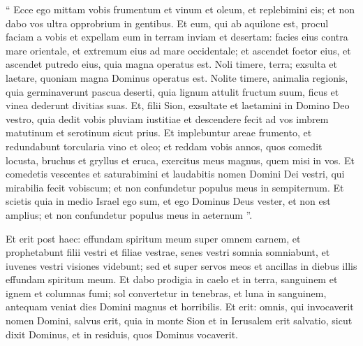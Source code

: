 \begin{biblechapter}
\begin{biblechapter}
 “ Ecce ego mittam vobis
 frumentum et vinum et oleum,
 et replebimini eis;
 et non dabo vos ultra
 opprobrium in gentibus.
 \verse Et eum, qui ab aquilone est,
 procul faciam a vobis
 et expellam eum in terram
 inviam et desertam:
 facies eius contra mare orientale,
 et extremum eius ad mare occidentale;
 et ascendet foetor eius,
 et ascendet putredo eius,
 quia magna operatus est.
 \verse Noli timere, terra;
 exsulta et laetare,
 quoniam magna Dominus operatus est.
 \verse Nolite timere, animalia regionis,
 quia germinaverunt pascua deserti,
 quia lignum attulit fructum suum,
 ficus et vinea dederunt divitias suas.
 \verse Et, filii Sion, exsultate
 et laetamini in Domino Deo vestro,
 quia dedit vobis
 pluviam iustitiae
 et descendere fecit ad vos
 imbrem matutinum et serotinum sicut prius.
 \verse Et implebuntur areae frumento,
 et redundabunt torcularia
 vino et oleo;
 \verse et reddam vobis annos,
 quos comedit locusta, bruchus
 et gryllus et eruca,
 exercitus meus magnus,
 quem misi in vos.
 \verse Et comedetis vescentes et saturabimini
 et laudabitis nomen Domini Dei vestri,
 qui mirabilia fecit vobiscum;
 et non confundetur populus meus in sempiternum.
 \verse Et scietis quia in medio Israel ego sum,
 et ego Dominus Deus vester,
 et non est amplius;
 et non confundetur populus meus in aeternum ”.
 
\begin{biblechapter}
 \verse Et erit post haec:
 effundam spiritum meum super omnem carnem,
 et prophetabunt filii vestri et filiae vestrae,
 senes vestri somnia somniabunt,
 et iuvenes vestri visiones videbunt;
 \verse sed et super servos meos et ancillas
 in diebus illis effundam spiritum meum.
 \verse Et dabo prodigia in caelo et in terra,
 sanguinem et ignem et columnas fumi;
 \verse sol convertetur in tenebras,
 et luna in sanguinem,
 antequam veniat dies Domini
 magnus et horribilis.
 \verse Et erit:
 omnis, qui invocaverit nomen Domini, salvus erit,
 quia in monte Sion et in Ierusalem
 erit salvatio, sicut dixit Dominus,
 et in residuis, quos Dominus vocaverit.
 

\end{biblechapter}
\end{biblechapter}
\end{biblechapter}
